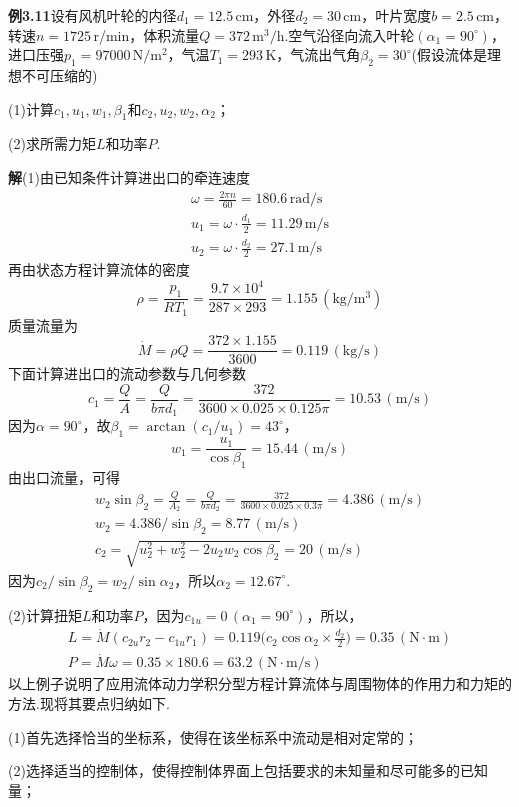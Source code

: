 \noindent\textbf{例3.11}\quad 设有风机叶轮的内径$d_1=12.5\,$cm，外径$d_2=30\,$cm，叶片宽度$b=2.5\,$cm，转速$n=1725\,$r/min，体积流量$Q=372\,\mathrm{m^3/h}$.空气沿径向流入叶轮$(\alpha_1=90^{\circ})$，进口压强$p_1=97000\,\mathrm{N/m^2}$，气温$T_1=293\,$K，气流出气角$\beta_2=30^{\circ}$(假设流体是理想不可压缩的)

(1)计算$c_1,u_1,w_1,\beta_1$和$c_2,u_2,w_2,\alpha_2$；

(2)求所需力矩$L$和功率$P$.

\noindent\textbf{解}\quad (1)由已知条件计算进出口的牵连速度
\begin{gather*}
\omega=\frac{2\pi n}{60}=180.6\,\mathrm{rad/s}\\[2pt]
u_1=\omega\cdot\frac{d_1}{2}=11.29\,\mathrm{m/s}\\[2pt]
u_2=\omega\cdot\frac{d_2}{2}=27.1\,\mathrm{m/s}
\end{gather*}
再由状态方程计算流体的密度
\[
\rho=\frac{p_1}{RT_1}=\frac{9.7\times 10^{4}}{287\times 293}=1.155\,(\mathrm{kg/m^3})
\]
质量流量为
\[
\dot{M}=\rho Q=\frac{372\times 1.155}{3600}=0.119\,(\mathrm{kg/s})
\]
下面计算进出口的流动参数与几何参数
\[
c_1=\frac{Q}{A}=\frac{Q}{b\pi d_1}=\frac{372}{3600\times 0.025\times 0.125\pi}=10.53\,(\mathrm{m/s})
\]
因为$\alpha=90^{\circ}$，故$\beta_1=\arctan(c_1/u_1)=43^{\circ}$，
\[
w_1=\frac{u_1}{\cos\beta_1}=15.44\,(\mathrm{m/s})
\]
由出口流量，可得
\begin{gather*}
w_2\sin\beta_2=\frac{Q}{A_2}=\frac{Q}{b\pi d_2}=\frac{372}{3600\times 0.025\times 0.3\pi}=4.386\,(\mathrm{m/s})\\[2pt]
w_2=4.386/\sin\beta_2=8.77\,(\mathrm{m/s})\\[2pt]
c_2=\sqrt{u_2^{2}+w_2^{2}-2u_2w_2\cos\beta_2}=20\,(\mathrm{m/s})
\end{gather*}
因为$c_2/\sin\beta_2=w_2/\sin\alpha_2$，所以$\alpha_2=12.67^{\circ}$.

(2)计算扭矩$L$和功率$P$，因为$c_{1u}=0\,(\alpha_1=90^{\circ})$，所以，
\begin{gather*}
L=\dot{M}(c_{2u}r_2-c_{1u}r_1)=0.119\Big(c_2\cos\alpha_2\times\frac{d_2}{2}\Big)=0.35\,(\mathrm{N\cdot m})\\[2pt]
P=\dot{M}\omega=0.35\times 180.6=63.2\,(\mathrm{N\cdot m/s})
\end{gather*}
以上例子说明了应用流体动力学积分型方程计算流体与周围物体的作用力和力矩的方法.现将其要点归纳如下.

(1)首先选择恰当的坐标系，使得在该坐标系中流动是相对定常的；

(2)选择适当的控制体，使得控制体界面上包括要求的未知量和尽可能多的已知量；

